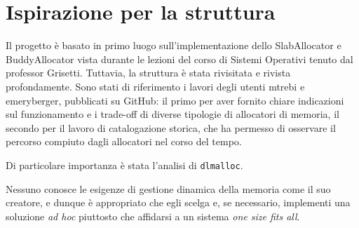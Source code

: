 \section{Ispirazione per la struttura}
Il progetto è basato in primo luogo sull’implementazione dello SlabAllocator e BuddyAllocator vista durante le lezioni del corso di Sistemi Operativi tenuto dal professor Grisetti. Tuttavia, la struttura è stata rivisitata e rivista profondamente. Sono stati di riferimento i lavori degli utenti mtrebi e emeryberger, pubblicati su GitHub: il primo per aver fornito chiare indicazioni sul funzionamento e i trade-off di diverse tipologie di allocatori di memoria, il secondo per il lavoro di catalogazione storica, che ha permesso di osservare il percorso compiuto dagli allocatori nel corso del tempo.

Di particolare importanza è stata l’analisi di \texttt{dlmalloc}.

Nessuno conosce le esigenze di gestione dinamica della memoria come il suo creatore, e dunque è appropriato che egli scelga e, se necessario, implementi una soluzione \textit{ad hoc} piuttosto che affidarsi a un sistema \textit{one size fits all}.
